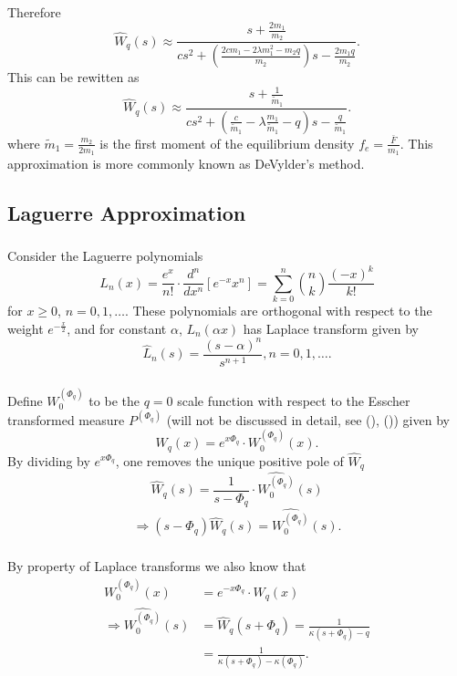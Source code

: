 \documentclass[xcolor=pdftex,dvipsnames,table]{beamer}
\theoremstyle{definition}
\def\lt{\left}
\def\rt{\right}
\begin{document}
\begin{frame}
\frametitle{\insertsectionhead}
\framesubtitle{\insertsubsectionhead}
Therefore
\[
\hat{W}_q(s) \approx \frac{s +\frac{2m_1}{m_2}}{cs^2 + \lt( \frac{2c m_1 - 2\lambda m_1^2 - m_2 q}{m_2} \rt) s -\frac{2m_1 q}{m_2}}.
\]
This can be rewitten as 
\[
\hat{W}_q(s) \approx \frac{s +\frac{1}{\tilde {m}_1}}{cs^2 + \lt( \frac{c}{\tilde{m}_1} - \lambda \frac{m_1}{\tilde{m}_1} -q \rt) s -\frac{q}{\tilde {m}_1}}.
\]
where $\tilde{m}_1 = \frac{m_2}{2m_1}$ is the first moment of the equilibrium density $f_e = \frac{\bar{F}}{m_1}$. This approximation is more commonly known as DeVylder's method.
\end{frame}

\subsection{Laguerre Approximation}
\label{LaguerreSec}
\begin{frame}
\frametitle{\insertsectionhead}
\framesubtitle{\insertsubsectionhead}
Consider the Laguerre polynomials
\[
L_n(x) = \frac{e^x}{n!} \cdot \frac{d^n}{dx^n}[e^{-x} x^n] = \sum_{k=0}^{n} \binom{n}{k} \frac{(-x)^k}{k!}
\]
for $x \geq 0$, $n=0, 1, \ldots$. These polynomials are orthogonal with respect to the weight $e^{-\frac{x}{2}}$, and for constant $\alpha$, $L_n(\alpha x)$ has Laplace transform given by
\[
\hat{L}_n(s) = \frac{(s-\alpha)^n}{s^{n+1}}, n=0,1, \ldots.
\]
\end{frame}

\begin{frame}
\frametitle{\insertsectionhead}
\framesubtitle{\insertsubsectionhead}
Define $W^{(\Phi_q)}_0$ to be the $q=0$ scale function with respect to the Esscher transformed measure $P^{(\Phi_q)}$ (will not be discussed in detail, see (\cite{AA}), (\cite{Kyp})) given by
\[
W_q(x) = e^{x \Phi_q} \cdot W^{(\Phi_q)}_0 (x).
\]
By dividing by $e^{x \Phi_q}$, one removes the unique positive pole of $\hat{W}_q$
\[
\hat{W}_q(s) = \frac{1}{s - \Phi_q} \cdot \widehat{W^{(\Phi_q)}_0} (s)
\]
\[
\Rightarrow (s - \Phi_q)\hat{W}_q(s) = \widehat{W^{(\Phi_q)}_0} (s).
\]
\end{frame}

\begin{frame}
\frametitle{\insertsectionhead}
\framesubtitle{\insertsubsectionhead}
By property of Laplace transforms we also know that
\begin{align*}
W^{(\Phi_q)}_0 (x) &=  e^{-x \Phi_q} \cdot W_q(x)\\
\Rightarrow \widehat{W^{(\Phi_q)}_0} (s) &= \hat{W}_q(s + \Phi_q) = \frac{1}{\kappa(s + \Phi_q) - q}\\
&= \frac{1}{\kappa(s + \Phi_q) - \kappa(\Phi_q)}.
\end{align*}
\end{frame}
\end{document}
